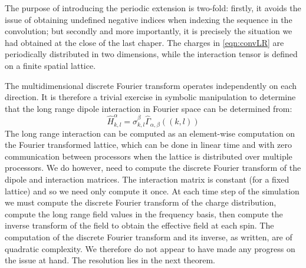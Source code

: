 \documentclass{article}
\theoremstyle{definition}
\begin{document}
The purpose of introducing the periodic extension is two-fold: firstly, it
avoids the issue of obtaining undefined negative indices when indexing the
sequence in the convolution; but secondly and more importantly, it is precisely
the situation we had obtained at the close of the last chaper. The charges in
\eqref{eqn:convLR} are periodically distributed in two dimensions, while the
interaction tensor is defined on a finite spatial lattice.

The multidimensional discrete Fourier transform operates independently on each
direction. It is therefore a trivial exercise in symbolic manipulation to
determine that the long range dipole interaction in Fourier space can be
determined from:
\begin{displaymath}
  \hat{H}^\alpha_{k,l} = \hat{\sigma}^\beta_{k,l} \hat{\Gamma}_{\alpha,\beta}((k,l))
\end{displaymath}
The long range interaction can be computed as an element-wise computation on the
Fourier transformed lattice, which can be done in linear time and with zero
communication between processors when the lattice is distributed over multiple
processors. We do however, need to compute the discrete Fourier transform of the
dipole and interaction matrices. The interaction matrix is constant (for a fixed
lattice) and so we need only compute it once. At each time step of the
simulation we must compute the discrete Fourier transform of the
charge distribution, compute the long range field values in the frequency basis,
then compute the inverse transform of the field to obtain the effective field at
each spin. The computation of the discrete Fourier transform and its inverse, as
written, are of quadratic complexity. We therefore do not appear to have made
any progress on the issue at hand. The resolution lies in the next theorem.
\end{document}
